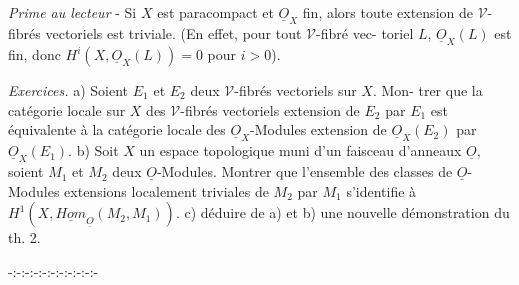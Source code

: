 \emph{Prime au lecteur} - Si $X$ est paracompact et $\underline{O}_X$ fin, alors toute extension
de $\mathcal{V}$-fibrés vectoriels est triviale. (En effet, pour tout $\mathcal{V}$-fibré vec-
toriel $L$, $\underline{O}_X(L)$ est fin, donc $H^i(X, \underline{O}_X(L)) = 0$ pour $i > 0$).

\emph{Exercices.} a) Soient $E_1$ et $E_2$ deux $\mathcal{V}$-fibrés vectoriels sur $X$. Mon-
trer que la catégorie locale sur $X$ des $\mathcal{V}$-fibrés vectoriels extension de
$E_2$ par $E_1$ est équivalente à la catégorie locale des $\underline{O}_X$-Modules extension
de $\underline{O}_X(E_2)$ par $\underline{O}_X(E_1)$. b) Soit $X$ un espace topologique muni d'un faisceau
d'anneaux $\underline{O}$, soient $M_1$ et $M_2$ deux $\underline{O}$-Modules. Montrer que l'ensemble
des classes de $\underline{O}$-Modules extensions localement triviales de $M_2$ par $M_1$
s'identifie à $H^1(X, \underline{Hom}_{\underline{O}}(M_2, M_1))$. c) déduire de a) et b) une nouvelle
démonstration du th. 2.

\begin{center}
-:-:-:-:-:-:-:-:-:-:-
\end{center}
